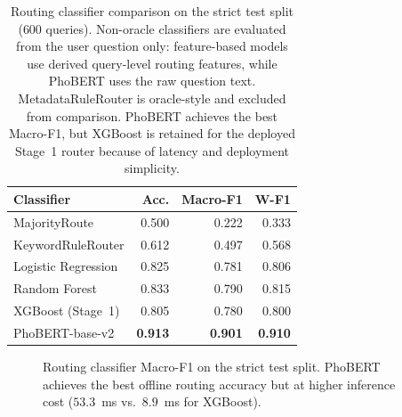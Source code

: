 \documentclass[11pt,twocolumn]{article}
\begin{document}
\begin{table}[!htbp]
\centering
\caption{Routing classifier comparison on the strict test split ($600$ queries). Non-oracle classifiers are evaluated from the user question only: feature-based models use derived query-level routing features, while PhoBERT uses the raw question text. MetadataRuleRouter is oracle-style and excluded from comparison. PhoBERT achieves the best Macro-F1, but XGBoost is retained for the deployed Stage~1 router because of latency and deployment simplicity.}
\label{tab:routing_baselines}
\scriptsize
\setlength{\tabcolsep}{2.4pt}
\begin{tabular}{lrrr}
\toprule
\textbf{Classifier} & \textbf{Acc.} & \textbf{Macro-F1} & \textbf{W-F1} \\
\midrule
MajorityRoute & 0.500 & 0.222 & 0.333 \\
KeywordRuleRouter & 0.612 & 0.497 & 0.568 \\
Logistic Regression & 0.825 & 0.781 & 0.806 \\
Random Forest & 0.833 & 0.790 & 0.815 \\
XGBoost (Stage~1) & 0.805 & 0.780 & 0.800 \\
PhoBERT-base-v2 & \textbf{0.913} & \textbf{0.901} & \textbf{0.910} \\
\bottomrule
\end{tabular}
\end{table}

\begin{figure}[!htbp]
\centering
{}
\caption{Routing classifier Macro-F1 on the strict test split.
PhoBERT achieves the best offline routing accuracy but at
higher inference cost ($53.3$~ms vs.\ $8.9$~ms for XGBoost).}
\label{fig:routing_baselines}
\end{figure}
\end{document}

